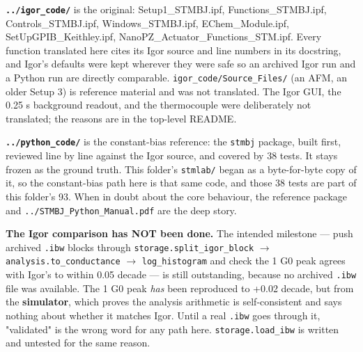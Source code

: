 \textbf{\texttt{.\discretionary{}{}{}.\discretionary{}{}{}/\discretionary{}{}{}igor\_\discretionary{}{}{}code/\discretionary{}{}{}}} is the original: Setup1\_STMBJ.ipf, Functions\_STMBJ.ipf, Controls\_STMBJ.ipf, Windows\_STMBJ.ipf, EChem\_Module.ipf, SetUpGPIB\_Keithley.ipf, NanoPZ\_Actuator\_Functions\_STM.ipf. Every function translated here cites its Igor source and line numbers in its docstring, and Igor's defaults were kept wherever they were safe so an archived Igor run and a Python run are directly comparable. \texttt{igor\_\discretionary{}{}{}code/\discretionary{}{}{}Source\_\discretionary{}{}{}Files/\discretionary{}{}{}} (an AFM, an older Setup 3) is reference material and was not translated. The Igor GUI, the 0.25 s background readout, and the thermocouple were deliberately not translated; the reasons are in the top-level README.

\textbf{\texttt{.\discretionary{}{}{}.\discretionary{}{}{}/\discretionary{}{}{}python\_\discretionary{}{}{}code/\discretionary{}{}{}}} is the constant-bias reference: the \texttt{stmbj} package, built first, reviewed line by line against the Igor source, and covered by 38 tests. It stays frozen as the ground truth. This folder's \texttt{stmlab/\discretionary{}{}{}} began as a byte-for-byte copy of it, so the constant-bias path here is that same code, and those 38 tests are part of this folder's 93. When in doubt about the core behaviour, the reference package and \texttt{.\discretionary{}{}{}.\discretionary{}{}{}/\discretionary{}{}{}STMBJ\_\discretionary{}{}{}Python\_\discretionary{}{}{}Manual.\discretionary{}{}{}pdf} are the deep story.

\textbf{The Igor comparison has NOT been done.} The intended milestone --- push archived \texttt{.\discretionary{}{}{}ibw} blocks through \texttt{storage.\discretionary{}{}{}split\_\discretionary{}{}{}igor\_\discretionary{}{}{}block} $\rightarrow$ \texttt{analysis.\discretionary{}{}{}to\_\discretionary{}{}{}conductance} $\rightarrow$ \texttt{log\_\discretionary{}{}{}histogram} and check the 1 G0 peak agrees with Igor's to within 0.05 decade --- is still outstanding, because no archived \texttt{.\discretionary{}{}{}ibw} file was available. The 1 G0 peak \emph{has} been reproduced to +0.02 decade, but from the \textbf{simulator}, which proves the analysis arithmetic is self-consistent and says nothing about whether it matches Igor. Until a real \texttt{.\discretionary{}{}{}ibw} goes through it, "validated" is the wrong word for any path here. \texttt{storage.\discretionary{}{}{}load\_\discretionary{}{}{}ibw} is written and untested for the same reason.

